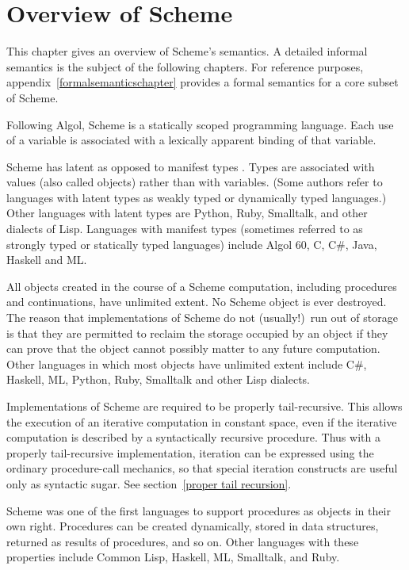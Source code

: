 
\chapter{Overview of Scheme}
\label{semanticchapter}

This chapter gives an overview of Scheme's semantics.  A
detailed informal semantics is the subject of
the following chapters.  For reference
purposes, appendix~\ref{formalsemanticschapter} provides a formal
semantics for a core subset of Scheme.

\vest Following Algol, Scheme is a statically scoped programming
language.  Each use of a variable is associated with a lexically
apparent binding of that variable.

\vest Scheme has latent as opposed to manifest types
\cite{WaiteGoos}.  Types
are associated with values (also called objects) rather than
with variables.  (Some authors refer to languages with latent types as
weakly typed or dynamically typed languages.)  Other languages with
latent types are Python, Ruby, Smalltalk, and other dialects of Lisp.  Languages
with manifest types (sometimes referred to as strongly typed or
statically typed languages) include Algol 60, C, C\#, Java, Haskell and ML.

\vest All objects created in the course of a Scheme computation, including
procedures and continuations, have unlimited extent.
No Scheme object is ever destroyed.  The reason that
implementations of Scheme do not (usually!)\ run out of storage is that
they are permitted to reclaim the storage occupied by an object if
they can prove that the object cannot possibly matter to any future
computation.  Other languages in which most objects have unlimited
extent include C\#, Haskell, ML, Python, Ruby, Smalltalk and other Lisp dialects.

\vest Implementations of Scheme are required to be properly tail-recursive.
This allows the execution of an iterative computation in constant space,
even if the iterative computation is described by a syntactically
recursive procedure.  Thus with a properly tail-recursive implementation,
iteration can be expressed using the ordinary procedure-call
mechanics, so that special iteration constructs are useful only as
syntactic sugar.  See section~\ref{proper tail recursion}.

\vest Scheme was one of the first languages to support procedures as
objects in their own right.  Procedures can be created dynamically,
stored in data structures, returned as results of procedures, and so
on.  Other languages with these properties include Common Lisp,
Haskell, ML, Smalltalk, and Ruby.

